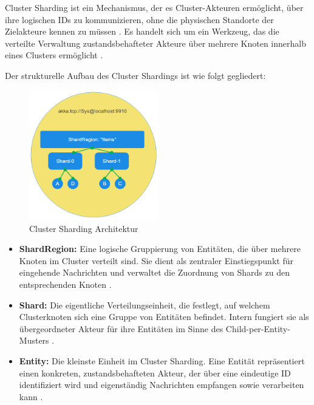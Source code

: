 Cluster Sharding ist ein Mechanismus, der es Cluster-Akteuren ermöglicht, über ihre logischen IDs zu kommunizieren, ohne die physischen Standorte der Zielakteure kennen zu müssen \parencite{getakka_cluster_sharding}.  
Es handelt sich um ein Werkzeug, das die verteilte Verwaltung zustandsbehafteter Akteure über mehrere Knoten innerhalb eines Clusters ermöglicht \parencite{cluster_sharding_petabridge}.  

Der strukturelle Aufbau des Cluster Shardings ist wie folgt gegliedert:

\begin{figure}[H]
    \centering
    \includegraphics[width=0.5\textwidth]{assets/cluster-sharding.png}
    \caption{Cluster Sharding Architektur \parencite{cluster_sharding_petabridge}}
    \label{fig:architecture}
\end{figure}

\begin{itemize}
    \item \textbf{ShardRegion:}
    Eine logische Gruppierung von Entitäten, die über mehrere Knoten im Cluster verteilt sind. Sie dient als zentraler Einstiegspunkt für eingehende Nachrichten und verwaltet die Zuordnung von Shards zu den entsprechenden Knoten \parencite{cluster_sharding_petabridge}.
    \item \textbf{Shard:}
    Die eigentliche Verteilungseinheit, die festlegt, auf welchem Clusterknoten sich eine Gruppe von Entitäten befindet. Intern fungiert sie als übergeordneter Akteur für ihre Entitäten im Sinne des Child-per-Entity-Musters \parencite{cluster_sharding_petabridge}.
    \item \textbf{Entity:}
    Die kleinste Einheit im Cluster Sharding. Eine Entität repräsentiert einen konkreten, zustandsbehafteten Akteur, der über eine eindeutige ID identifiziert wird und eigenständig Nachrichten empfangen sowie verarbeiten kann \parencite{cluster_sharding_petabridge}.
\end{itemize}

